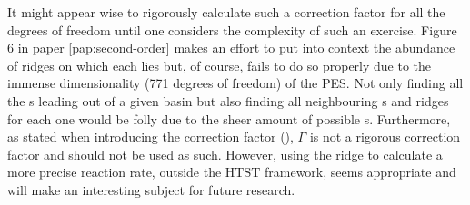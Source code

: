 It might appear wise to rigorously calculate such a correction factor for all the degrees of freedom until one considers the complexity of such an exercise.
Figure 6 in paper \ref{pap:second-order} makes an effort to put into context the abundance of ridges on which each  lies but, of course, fails to do so properly due to the immense dimensionality (771 degrees of freedom) of the PES.
Not only finding all the s leading out of a given basin but also finding all neighbouring s and ridges for each one would be folly due to the sheer amount of possible \sap{}s.
Furthermore, as stated when introducing the correction factor (), $\Gamma$ is not a rigorous correction factor and should not be used as such.
However, using the ridge to calculate a more precise reaction rate, outside the HTST framework, seems appropriate and will make an interesting subject for future research.


